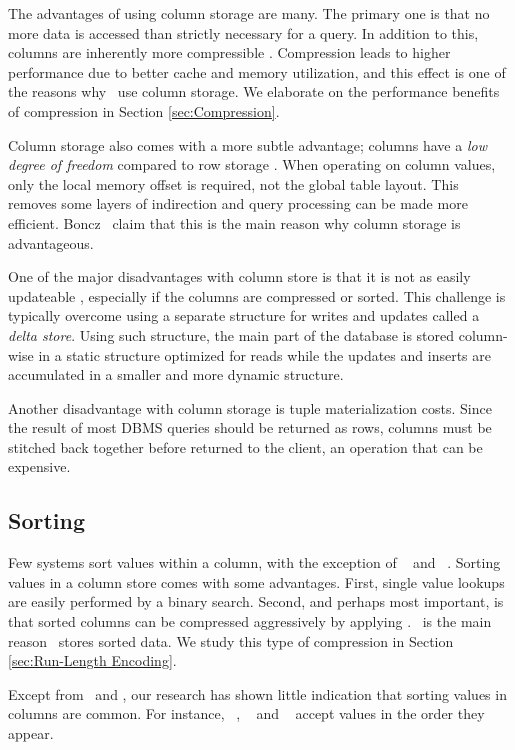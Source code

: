 The advantages of using column storage are many. The primary one is that no more data is accessed than strictly necessary for a query. In addition to this, columns are inherently more compressible \cite{noauthor_undated-vq}. Compression leads to higher performance due to better cache and memory utilization, and this effect is one of the reasons why \mssql~use column storage. We elaborate on the performance benefits of compression in Section \ref{sec:Compression}.

Column storage also comes with a more subtle advantage; columns have a \textit{low degree of freedom} compared to row storage \cite{Boncz2005-wj}. When operating on column values, only the local memory offset is required, not the global table layout. This removes some layers of indirection and query processing can be made more efficient. Boncz \ea~claim that this is the main reason why column storage is advantageous.

One of the major disadvantages with column store is that it is not as easily updateable \cite{Bjorklund2011-wh}, especially if the columns are compressed or sorted. This challenge is typically overcome using a separate structure for writes and updates called a \textit{delta store}. Using such structure, the main part of the database is stored column-wise in a static structure optimized for reads while the updates and inserts are accumulated in a smaller and more dynamic structure.  

Another disadvantage with column storage is tuple materialization costs. Since the result of most DBMS queries should be returned as rows, columns must be stitched back together before returned to the client, an operation that can be expensive.

\subsection{Sorting}
\label{sub:Sorting}
Few systems sort values within a column, with the exception of \cstore~\cite{Stonebraker2005-qz} and \vertica~\cite{Lamb2012-kg}. Sorting values in a column store comes with some advantages. First, single value lookups are easily performed by a binary search. Second, and perhaps most important, is that sorted columns can be compressed aggressively by applying \rle. \rle~is the main reason \cstore~stores sorted data. We study this type of compression in Section \ref{sec:Run-Length Encoding}.

Except from \cstore~and \vertica, our research has shown little indication that sorting values in columns are common. For instance, \mssql~\cite{Larson2013-mc}, \blink~\cite{Raman2013-em} and \oracle~\cite{Lahiri2015-mz} accept values in the order they appear.

